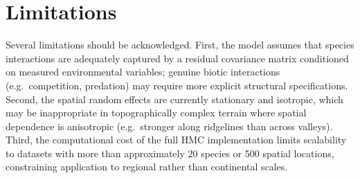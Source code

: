 \section{Limitations}

Several limitations should be acknowledged. First, the model assumes that
species interactions are adequately captured by a residual covariance matrix
conditioned on measured environmental variables; genuine biotic interactions
(e.g.\ competition, predation) may require more explicit structural
specifications. Second, the spatial random effects are currently stationary and
isotropic, which may be inappropriate in topographically complex terrain where
spatial dependence is anisotropic (e.g.\ stronger along ridgelines than across
valleys). Third, the computational cost of the full HMC implementation limits
scalability to datasets with more than approximately 20 species or 500 spatial
locations, constraining application to regional rather than continental scales.
